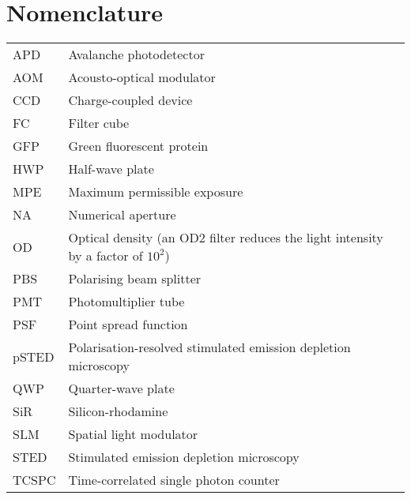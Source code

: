 \chapter{Nomenclature}

\begin{tabular}{ll}
	APD   & Avalanche photodetector                                                              \\
	AOM   & Acousto-optical modulator                                                            \\
	CCD   & Charge-coupled device                                                                \\
	FC    & Filter cube                                                                          \\
	GFP   & Green fluorescent protein                                                            \\
	HWP   & Half-wave plate                                                                      \\
	MPE   & Maximum permissible exposure                                                         \\
	NA    & Numerical aperture                                                                   \\
	OD    & Optical density  (an OD2 filter reduces the light intensity by a factor of $ 10^2 $) \\
	PBS   & Polarising beam splitter                                                             \\
	PMT   & Photomultiplier tube                                                                 \\
	PSF   & Point spread function                                                                \\
	pSTED & Polarisation-resolved stimulated emission depletion microscopy                       \\
	QWP   & Quarter-wave plate                                                                   \\
	SiR   & Silicon-rhodamine                                                                    \\
	SLM   & Spatial light modulator                                                              \\
	STED  & Stimulated emission depletion  microscopy                                            \\
	TCSPC & Time-correlated single photon counter
\end{tabular}